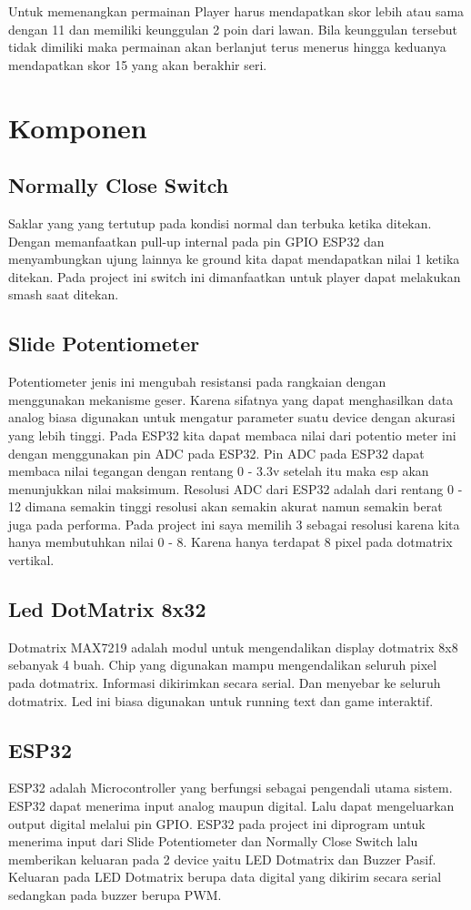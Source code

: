 \documentclass[a4paper,12pt]{article}
\begin{document}
Untuk memenangkan permainan Player harus mendapatkan skor lebih atau sama dengan 11 dan memiliki keunggulan 2 poin
dari lawan. Bila keunggulan tersebut tidak dimiliki maka permainan akan berlanjut terus menerus hingga keduanya mendapatkan skor 15
yang akan berakhir seri.

\section{Komponen}
\subsection{Normally Close Switch}
Saklar yang yang tertutup pada kondisi normal dan terbuka ketika ditekan. Dengan memanfaatkan pull-up internal
pada pin GPIO ESP32 dan menyambungkan ujung lainnya ke ground kita dapat mendapatkan nilai 1 ketika ditekan.
Pada project ini switch ini dimanfaatkan untuk player dapat melakukan smash saat ditekan.

\subsection{Slide Potentiometer}
Potentiometer jenis ini mengubah resistansi pada rangkaian dengan menggunakan mekanisme geser. Karena sifatnya
yang dapat menghasilkan data analog biasa digunakan untuk mengatur parameter suatu device dengan akurasi yang lebih
tinggi. Pada ESP32 kita dapat membaca nilai dari potentio meter ini dengan menggunakan pin ADC pada ESP32.
Pin ADC pada ESP32 dapat membaca nilai tegangan dengan rentang 0 - 3.3v setelah itu maka esp akan menunjukkan
nilai maksimum. Resolusi ADC dari ESP32 adalah dari rentang 0 - 12 dimana semakin tinggi resolusi akan semakin akurat namun
semakin berat juga pada performa. Pada project ini saya memilih 3 sebagai resolusi karena kita hanya membutuhkan
nilai 0 - 8. Karena hanya terdapat 8 pixel pada dotmatrix vertikal.

\subsection{Led DotMatrix 8x32}
Dotmatrix MAX7219 adalah modul untuk mengendalikan display dotmatrix 8x8 sebanyak 4 buah. Chip yang digunakan mampu
mengendalikan seluruh pixel pada dotmatrix. Informasi dikirimkan secara serial. Dan menyebar ke seluruh dotmatrix.
Led ini biasa digunakan untuk running text dan game interaktif.

\subsection{ESP32}
ESP32 adalah Microcontroller yang berfungsi sebagai pengendali utama sistem. ESP32 dapat menerima input analog
maupun digital. Lalu dapat mengeluarkan output digital melalui pin GPIO. ESP32 pada project ini diprogram
untuk menerima input dari Slide Potentiometer dan Normally Close Switch lalu memberikan keluaran pada 2 device
yaitu LED Dotmatrix dan Buzzer Pasif. Keluaran pada LED Dotmatrix berupa data digital yang dikirim secara serial
sedangkan pada buzzer berupa PWM.
\end{document}
